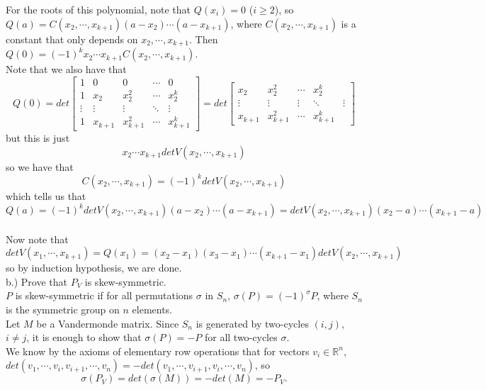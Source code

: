 \documentclass[12pt]{article}
\begin{document}
For the roots of this polynomial, note that $Q(x_i) = 0$ ($i \geq 2$), so $Q(a) = C(x_2, \cdots, x_{k+1}) (a - x_2) \cdots (a - x_{k+1})$, where $C(x_2, \cdots, x_{k+1})$ is a constant that only depends on $x_2, \cdots, x_{k+1}$. Then $Q(0) = (-1)^k x_2 \cdots x_{k+1} C(x_2, \cdots, x_{k+1})$.\\

Note that we also have that
$$ Q(0) = det \begin{bmatrix} 1 & 0 & 0 & \cdots & 0 \\ 1 &x_2 & x_2^2 & \cdots & x_2^{k} \\ \vdots & \vdots & \vdots & \ddots & \vdots \\ 1 &x_{k+1} & x_{k+1}^2 & \cdots & x_{k+1}^{k} \end{bmatrix} = det \begin{bmatrix}  x_2 & x_2^2 & \cdots & x_2^{k} \\ \vdots & \vdots & \vdots & \ddots & \vdots \\ x_{k+1} & x_{k+1}^2 & \cdots & x_{k+1}^{k} \end{bmatrix}$$
but this is just
$$x_2 \cdots x_{k+1} det V(x_2, \cdots , x_{k+1})$$
so we have that
$$C(x_2, \cdots, x_{k+1}) = (-1)^k det V(x_2, \cdots , x_{k+1})$$
which tells us that
$$Q(a) = (-1)^k det V(x_2, \cdots , x_{k+1}) (a - x_2) \cdots (a - x_{k+1}) = det V(x_2, \cdots , x_{k+1}) (x_2 - a) \cdots (x_{k+1} - a)$$\\

Now note that 
$$det V(x_1, \cdots, x_{k+1}) = Q(x_1) = (x_2 - x_1)(x_3 - x_1) \cdots (x_{k+1} - x_1) det V(x_2, \cdots, x_{k+1})$$
so by induction hypothesis, we are done. \\

b.) Prove that $P_V$ is skew-symmetric. \\

$P$ is skew-symmetric if for all permutations $\sigma$ in $S_n$,
$\sigma(P) = (-1)^\sigma P$, where $S_n$ is the symmetric group on $n$ elements. \\

Let $M$ be a Vandermonde matrix. Since $S_n$ is generated by two-cycles $(i, j)$, $i \neq j$, it is enough to show that $\sigma(P) = -P$ for all two-cycles $\sigma$. \\

We know by the axioms of elementary row operations that for vectors $v_i \in \mathbb{R}^n$, $det(v_1, \cdots, v_i, v_{i+1}, \cdots, v_n) = -det(v_1, \cdots, v_{i+1}, v_i, \cdots, v_n)$, so $$\sigma(P_V)= det(\sigma(M)) =  -det(M) = -P_V.$$\\
\end{document}
